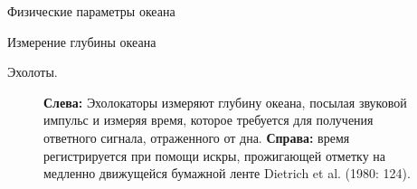 \begin{chapter}{Физические параметры океана}
\begin{section}{Измерение глубины океана}
\begin{paragraph}{Эхолоты.}
\begin{figure}[t!]
\caption{\textbf{Слева:} Эхолокаторы измеряют глубину океана, посылая звуковой 
импульс и измеряя время, которое требуется для получения ответного сигнала, 
отраженного от дна.
\textbf{Справа:} время регистрируется при помощи искры, прожигающей отметку на
медленно движущейся бумажной ленте Dietrich et al. (1980: 124).}
\label{fig:Sonar}
\end{figure}
%


\end{paragraph}
\end{section}
\end{chapter}
